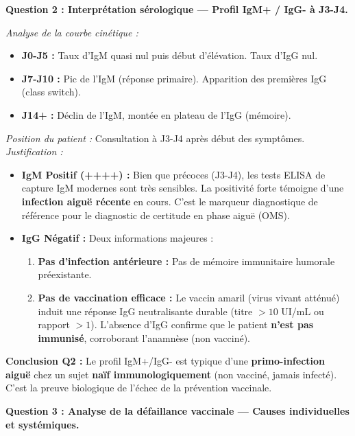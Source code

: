 \documentclass[11pt]{article}
\begin{document}
\begin{exoresolu}
\textbf{Question 2 : Interprétation sérologique — Profil IgM+ / IgG- à J3-J4.}

\textit{Analyse de la courbe cinétique :}
\begin{itemize}
    \item \textbf{J0-J5 :} Taux d'IgM quasi nul puis début d'élévation. Taux d'IgG nul.
    \item \textbf{J7-J10 :} Pic de l'IgM (réponse primaire). Apparition des premières IgG (class switch).
    \item \textbf{J14+ :} Déclin de l'IgM, montée en plateau de l'IgG (mémoire).
\end{itemize}
\textit{Position du patient :} Consultation à J3-J4 après début des symptômes.
\textit{Justification :}
\begin{itemize}
    \item \textbf{IgM Positif (++++) :} Bien que précoces (J3-J4), les tests ELISA de capture IgM modernes sont très sensibles. La positivité forte témoigne d'une \textbf{infection aiguë récente} en cours. C'est le marqueur diagnostique de référence pour le diagnostic de certitude en phase aiguë (OMS).
    \item \textbf{IgG Négatif :} Deux informations majeures :
    \begin{enumerate}
        \item \textbf{Pas d'infection antérieure :} Pas de mémoire immunitaire humorale préexistante.
        \item \textbf{Pas de vaccination efficace :} Le vaccin amaril (virus vivant atténué) induit une réponse IgG neutralisante durable (titre $> 10$ UI/mL ou rapport $> 1$). L'absence d'IgG confirme que le patient \textbf{n'est pas immunisé}, corroborant l'anamnèse (non vacciné).
    \end{enumerate}
\end{itemize}
\textbf{Conclusion Q2 :} Le profil IgM+/IgG- est typique d'une \textbf{primo-infection aiguë} chez un sujet \textbf{naïf immunologiquement} (non vacciné, jamais infecté). C'est la preuve biologique de l'échec de la prévention vaccinale.

\textbf{Question 3 : Analyse de la défaillance vaccinale — Causes individuelles et systémiques.}


\end{exoresolu}
\end{document}
